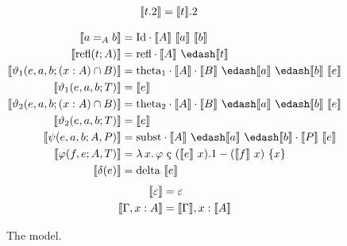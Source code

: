 \begin{figure}
\begin{minipage}{0.5\textwidth}
\begin{align*}
            \llbracket t.2 \rrbracket &= \llbracket t \rrbracket.2
        \end{align*}
    \end{minipage}
    \begin{align*}
        \sema{a =_A b} &= \cId \cdot \sema{A}\ \sema{a}\ \sema{b} \\
        \sema{\text{refl}(t; A)} &= \crefl \cdot \sema{A}\ \edash \sema{t} \\
        \sema{\vartheta_1(e, a, b; (x : A) \cap B)} &= \cthetaone \cdot \sema{A} \cdot \sema{B}\ \edash \sema{a}\ \edash \sema{b}\ \sema{e} \\
        \sema{\vartheta_1(e, a, b; T)} &= \sema{e} \\
        \sema{\vartheta_2(e, a, b; (x : A) \cap B)} &= \cthetatwo \cdot \sema{A} \cdot \sema{B}\ \edash \sema{a}\ \edash \sema{b}\ \sema{e} \\
        \sema{\vartheta_2(e, a, b; T)} &= \sema{e} \\
        \sema{\psi(e, a, b; A, P)} &= \csubst  \cdot \sema{A}\ \edash \sema{a}\ \edash \sema{b} \cdot \sema{P}\ \sema{e} \\
        \sema{\varphi(f, e; A, T)} &= \absu{\lambda}{x}{\varphi\ \text{\c{c}}\ (\sema{e}\ x).1 - (\sema{f}\ x)\ \{ x \} } \\
        \sema{\delta(e)} &= \cdelta\ \sema{e}
    \end{align*}
    \begin{align*}
        \llbracket \varepsilon \rrbracket &= \varepsilon \\
        \llbracket \Gamma, x : A \rrbracket &= \llbracket \Gamma \rrbracket, x : \llbracket A \rrbracket
    \end{align*}
    \caption{
        The model.
    }
    \label{fig:4:model}
\end{figure}

